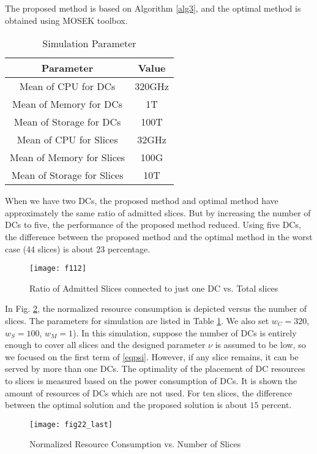 \documentclass[conference]{IEEEtran}
\begin{document}
The proposed method is based on Algorithm \ref{alg3}, and the optimal method is obtained using MOSEK toolbox.
\begin{small}
 \begin{table}
 \caption {Simulation Parameter} \label{table:1}
 \begin{center}
  \begin{tabular}{||c c ||}
  \hline
  Parameter & Value \\ [0.5ex]
  \hline\hline
  Mean of CPU for DCs & 320GHz\\
  \hline
  Mean of Memory for DCs & 1T\\
  \hline
 Mean of Storage for DCs & 100T \\
  \hline
   Mean of CPU for Slices & 32GHz\\
  \hline
  Mean of Memory for Slices & 100G\\
  \hline
 Mean of Storage for Slices & 10T \\ [1ex]
  \hline
 \end{tabular}
 \end{center}
 \end{table}
\end{small}
When we have two DCs, the proposed method and optimal method have approximately the same ratio of admitted slices. But by increasing the number of DCs to five, the performance of the proposed method reduced. Using five DCs, the difference between the
proposed method and the optimal method in the worst case (44 slices) is about $23$ percentage.
\begin{figure}%
  \centering
    \texttt{[image: f112]}
  \caption{Ratio of Admitted Slices connected to just one DC vs. Total slices}
  \label{fig:f1}
\end{figure}
In Fig. \ref{fig:f2}, the normalized resource consumption is depicted versus the number of slices. The parameters for simulation are listed in Table \ref{table:1}. We also set $w_C = 320$, $w_S = 100$, $w_M =1$). In this simulation, suppose the number of DCs is entirely enough to cover all slices and the designed parameter $\nu$ is assumed to be low, so we focused on the first term of \eqref{eqpsi}. However, if any slice remains, it can be served by more than one DCs. The optimality of the placement of DC resources to slices is measured based on the power consumption of DCs. It is shown the amount of resources of DCs which are not used. For ten slices, the difference between the optimal solution and the proposed solution is about $15$ percent.
\begin{figure}%
  \centering
    \texttt{[image: fig22\_last]}
  \caption{Normalized Resource Consumption vs. Number of Slices}
  \label{fig:f2}
\end{figure}
\end{document}
